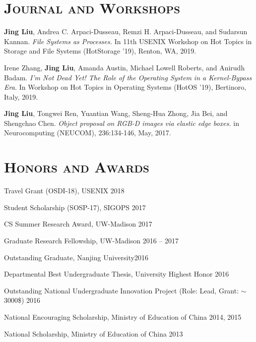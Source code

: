 \documentclass[10pt, letterpaper]{article}
\renewenvironment{itemize}{
  \begin{list}{}{
    \setlength{\leftmargin}{1.2em}
    \setlength{\itemsep}{0.12em}
    \setlength{\parskip}{0pt}
    \setlength{\parsep}{0.12em}
  }
}{
  \end{list}
}
\begin{document}
\section*{\textsc{Journal and Workshops}}

\begin{enumerate}[fullwidth,itemindent=1em,label={[\arabic*]}]
	\item {\bf Jing Liu}, Andrea C. Arpaci-Dusseau, Remzi H. Arpaci-Dusseau, and Sudarsun Kannan. \textit{File Systems as Processes.} In 11th USENIX Workshop on Hot Topics in Storage and File Systems (HotStorage '19), Renton, WA, 2019.
	\item Irene Zhang, {\bf Jing Liu}, Amanda Austin, Michael Lowell Roberts,
        and Anirudh Badam. \textit{I’m Not Dead Yet! The Role of the Operating System in a Kernel-Bypass Era.} In Workshop on Hot Topics in Operating Systems (HotOS '19), Bertinoro, Italy, 2019.
    \item {\bf Jing Liu}, Tongwei Ren, Yuantian Wang, Sheng-Hua Zhong, Jia Bei, and Shengchao Chen. \textit{Object proposal on RGB-D images via elastic edge boxes.} in Neurocomputing  (NEUCOM), 236:134-146, May, 2017.
\end{enumerate}

\section*{\textsc{Honors and Awards}}
\begin{itemize}
  \item Travel Grant (OSDI-18), USENIX \hfill 2018
  \item Student Scholarship (SOSP-17), SIGOPS \hfill 2017
  \item CS Summer Research Award, UW-Madison \hfill 2017
  \item Graduate Research Fellowship, UW-Madison \hfill 2016 -- 2017
  \item Outstanding Graduate, Nanjing University\hfill 2016
  \item Departmental Best Undergraduate Thesis, University Highest Honor \hfill 2016
  \item Outstanding National Undergraduate Innovation Project (Role: Lead, Grant: $\sim$3000\$)  \hfill 2016
  \item National Encouraging Scholarship, Ministry of Education of China \hfill 2014, 2015
  \item National Scholarship, Ministry of Education of China \hfill 2013
\end{itemize}
\end{document}
